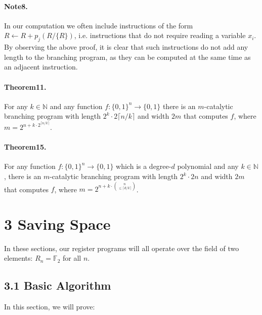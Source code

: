 \documentclass[10pt,a4paper]{article}
\begin{document}
\paragraph{Note8.} In our computation we often include instructions of the form $R\leftarrow R+p_j(R/\{R\})$, i.e. instructions that do not require reading a variable $x_i$. By observing the above proof, it is clear that such instructions do not add any length to the branching program, as they can be computed at the same time as an adjacent instruction.

\paragraph{Theorem11.} For any $k\in\mathbb N$ and any function $f:\{0,1\}^n\to\{0,1\}$ there is an $m$-catalytic branching program with length $2^k\cdot2\lceil n/k\rceil$ and width $2m$ that computes $f$, where $m=2^{n+k\cdot2^{\lceil n/k\rceil}}$.
\paragraph{Theorem15.} For any function $f:\{0,1\}^n\to\{0,1\}$ which is a degree-$d$ polynomial and any $k\in\mathbb N$, there is an $m$-catalytic branching program with length $2^k\cdot2n$ and width $2m$ that computes $f$, where $m=2^{n+k\cdot\binom n{\leq\lceil d/k\rceil}}$.

\section*{3 Saving Space}
In these sections, our register programs will all operate over the field of two elements: $R_n=\mathbb F_2$ for all $n$.
\subsection*{3.1 Basic Algorithm}
In this section, we will prove:
\end{document}
